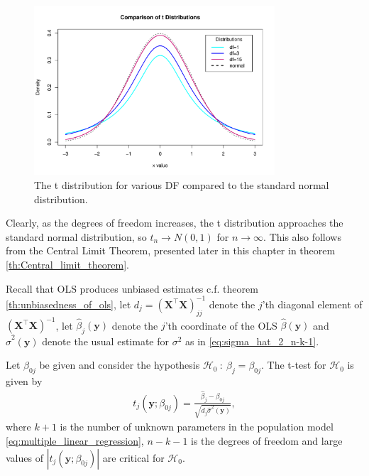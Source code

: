 \begin{figure}[H]
    \centering
    \includegraphics[width = 0.8\textwidth]{figures/t_distribution.pdf}
    \caption{The t distribution for various DF compared to the standard normal distribution.}
    \label{fig:t_distribution}
\end{figure}

Clearly, as the degrees of freedom increases, the t distribution approaches the standard normal distribution, so $t_n \rightarrow N(0,1)$ for $n\rightarrow \infty$. This also follows from the Central Limit Theorem, presented later in this chapter in theorem \ref{th:Central_limit_theorem}. 

Recall that OLS produces unbiased estimates c.f. theorem \ref{th:unbiasedness_of_ols}, let $d_j=(\textbf{X}^\top\textbf{X})^{-1}_{jj}$ denote the $j$'th diagonal element of $(\textbf{X}^\top \textbf{X})^{-1}$, let $\hat{\beta}_j(\textbf{y})$ denote the $j$'th coordinate of the OLS $\hat{\beta}(\textbf{y})$ and $\hat{\sigma}^2(\textbf{y})$ denote the usual estimate for $\sigma^2$ as in \eqref{eq:sigma_hat_2_n-k-1}.

\begin{definition} [$t$-test] \label{def:t-test}
    Let $\beta_{0j}$ be given and consider the hypothesis $\mathcal{H}_0 \ : \ \beta_j=\beta_{0j}$. The t-test for $\mathcal{H}_0$ is given by
\begin{align}\label{eq:t_test1}
   t_j(\textbf{y};\beta_{0j}) = \frac{\hat{\beta}_j - \beta_{0j}}{\sqrt{d_j\hat{\sigma}^2(\textbf{y})}}, 
\end{align}
where $k+1$ is the number of unknown parameters in the population model \eqref{eq:multiple_linear_regression}, $n-k-1$ is the degrees of freedom and large values of $|t_j(\textbf{y};\beta_{0j})|$ are critical for $\mathcal{H}_0$.
\end{definition}

